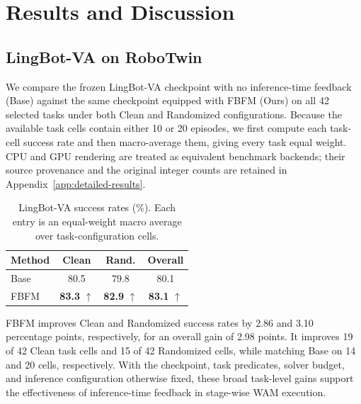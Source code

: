 
\section{Results and Discussion}
\label{sec:results-discussion}


\subsection{LingBot-VA on RoboTwin}

We compare the frozen LingBot-VA checkpoint with no inference-time feedback
(Base) against the same checkpoint equipped with FBFM (Ours) on all 42 selected
tasks under both Clean and Randomized configurations. Because the available
task cells contain either 10 or 20 episodes, we first compute each task-cell
success rate and then macro-average them, giving every task equal weight. CPU
and GPU rendering are treated as equivalent benchmark backends; their source
provenance and the original integer counts are retained in
Appendix~\ref{app:detailed-results}.

\begin{table}[t]
    \centering
    \small
    \setlength{\tabcolsep}{4pt}
    \begin{tabular}{lccc}
        \toprule
        Method & Clean & Rand. & Overall \\
        \midrule
        Base & 80.5 & 79.8 & 80.1 \\
        FBFM & \textbf{83.3} $\uparrow$ & \textbf{82.9} $\uparrow$ &
        \textbf{83.1} $\uparrow$ \\
        \bottomrule
    \end{tabular}
    \caption{LingBot-VA success rates (\%). Each entry is an equal-weight
    macro average over task-configuration cells.}
    \label{tab:lingbot-robotwin-summary}
\end{table}

FBFM improves Clean and Randomized success rates by 2.86 and 3.10 percentage
points, respectively, for an overall gain of 2.98 points. It improves 19 of 42
Clean task cells and 15 of 42 Randomized cells, while matching Base on 14 and 20
cells, respectively. With the checkpoint, task predicates, solver budget, and
inference configuration otherwise fixed, these broad task-level gains support
the effectiveness of inference-time feedback in stage-wise WAM execution.

